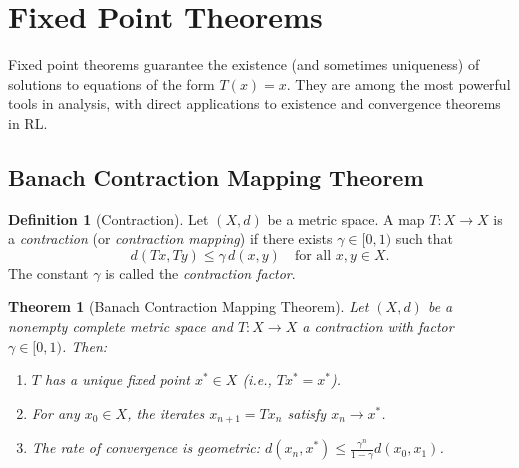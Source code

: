 \documentclass[11pt,a4paper]{article}
\theoremstyle{definition}
\newtheorem{definition}{Definition}[section]
\theoremstyle{plain}
\newtheorem{theorem}{Theorem}[section]
\theoremstyle{remark}
\begin{document}
\section{Fixed Point Theorems}\label{sec:fixed-point}

Fixed point theorems guarantee the existence (and sometimes uniqueness) of
solutions to equations of the form $T(x) = x$. They are among the most
powerful tools in analysis, with direct applications to existence and
convergence theorems in RL.

\subsection{Banach Contraction Mapping Theorem}

\begin{definition}[Contraction]\label{def:contraction}
Let $(X, d)$ be a metric space. A map $T \colon X \to X$ is a
\emph{contraction} (or \emph{contraction mapping}) if there exists
$\gamma \in [0, 1)$ such that
\[
    d(Tx, Ty) \leq \gamma \, d(x, y) \quad \text{for all } x, y \in X.
\]
The constant $\gamma$ is called the \emph{contraction factor}.
\end{definition}

\begin{theorem}[Banach Contraction Mapping Theorem]\label{thm:banach-contraction}
Let $(X, d)$ be a nonempty complete metric space and $T \colon X \to X$ a
contraction with factor $\gamma \in [0,1)$. Then:
\begin{enumerate}[label=(\roman*)]
    \item $T$ has a unique fixed point $x^* \in X$ (i.e., $Tx^* = x^*$).
    \item For any $x_0 \in X$, the iterates $x_{n+1} = Tx_n$ satisfy
          $x_n \to x^*$.
    \item The rate of convergence is geometric:
          $d(x_n, x^*) \leq \frac{\gamma^n}{1 - \gamma} d(x_0, x_1)$.
\end{enumerate}
\end{theorem}
\end{document}
